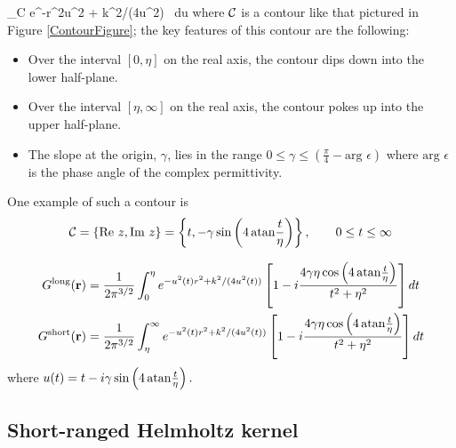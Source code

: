\documentclass[letterpaper]{article}
\begin{document}
{
\equiv 
  \int_{\mc C}
  e^{-r^2u^2 + k^2/(4u^2)} \, du
}
where $\mathcal{C}$ is a contour like that pictured
in Figure \ref{ContourFigure}; the key features 
of this contour are the following:
\begin{itemize}
 \item
 Over the interval $[0,\eta]$ on the real axis,
 the contour dips down into the lower half-plane.
 \item
 Over the interval $[\eta,\infty]$ on the real axis,
 the contour pokes up into the upper half-plane.
 \item
 The slope at the origin, $\gamma$, lies in the range
 $ 0 \le \gamma \le \left(\frac{\pi}{4} - \text{arg }\epsilon\right)$
 where $\text{arg }\epsilon$ is the phase angle of
 the complex permittivity.
\end{itemize}

One example of such a contour is 
$$ \mathcal{C} 
    = \{ \text{Re } z, \text{Im } z\}
    = \left\{ t, -\gamma \sin\left(4\, \text{atan} \frac{t}{\eta}\right)\right\},
      \qquad 0\le t \le \infty
$$

\begin{align*}
 G^{\hbox{\scriptsize{long}}}(\mathbf{r}) 
&=\frac{1}{2\pi^{3/2}} 
  \int_0^\eta e^{-u^2(t) r^2 + k^2/(4u^2(t))}
  \left[ 1 - i\frac{4 \gamma \eta \cos\left(4\, \text{atan} \frac{t}{\eta}\right)}
                   {t^2 + \eta^2}
  \right] dt
\\
 G^{\hbox{\scriptsize{short}}}(\mathbf{r}) 
&=\frac{1}{2\pi^{3/2}} 
  \int_\eta^\infty e^{-u^2(t) r^2 + k^2/(4u^2(t))}
  \left[ 1 - i\frac{4 \gamma \eta \cos\left(4\, \text{atan} \frac{t}{\eta}\right)}
                   {t^2 + \eta^2}
  \right] dt
\end{align*}
where $u(t)=t-i\gamma\sin\left(4\,\text{atan}\frac{t}{\eta}\right).$

\subsection*{Short-ranged Helmholtz kernel}
\end{document}
